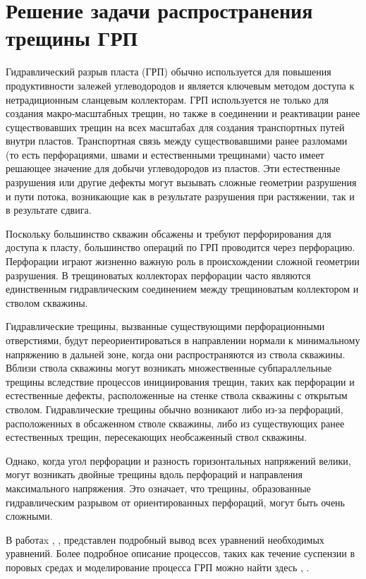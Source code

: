 \chapter*{Решение задачи распространения трещины ГРП}

Гидравлический разрыв пласта (ГРП) обычно используется для повышения продуктивности залежей углеводородов и является ключевым методом доступа к нетрадиционным сланцевым коллекторам. ГРП используется не только для создания макро-масштабных трещин, но также в соединении и реактивации ранее существовавших трещин на всех масштабах для создания транспортных путей внутри пластов. Транспортная связь между существовавшими ранее разломами (то есть перфорациями, швами и естественными трещинами) часто имеет решающее значение для добычи углеводородов из пластов. Эти естественные разрушения или другие дефекты могут вызывать сложные геометрии разрушения и пути потока, возникающие как в результате разрушения при растяжении, так и в результате сдвига. 

Поскольку большинство скважин обсажены и требуют перфорирования для доступа к пласту, большинство операций по ГРП проводится через перфорацию. Перфорации играют жизненно важную роль в происхождении сложной геометрии разрушения. В трещиноватых коллекторах перфорации часто являются единственным гидравлическим соединением между трещиноватым коллектором и стволом скважины. 

Гидравлические трещины, вызванные существующими перфорационными отверстиями, будут переориентироваться в направлении нормали к минимальному напряжению в дальней зоне, когда они распространяются из ствола скважины. Вблизи ствола скважины могут возникать множественные субпараллельные трещины вследствие процессов инициирования трещин, таких как перфорации и естественные дефекты, расположенные на стенке ствола скважины с открытым стволом. Гидравлические трещины обычно возникают либо из-за перфораций, расположенных в обсаженном стволе скважины, либо из существующих ранее естественных трещин, пересекающих необсаженный ствол скважины. 

\newpage

Однако, когда угол перфорации и разность горизонтальных напряжений велики, могут возникать двойные трещины вдоль перфораций и направления максимального напряжения. Это означает, что трещины, образованные гидравлическим разрывом от ориентированных перфораций, могут быть очень сложными.

В работаx \cite{selvadurai1996mechanics}, \cite{wang2017theory}, \cite{merxhani2016introduction} представлен подробный вывод всех уравнений необходимых уравнений. Более подробное описание процессов, таких как течение суспензии в поровых средах и моделирование процесса ГРП можно найти здесь \cite{liu2019fluid}, \cite{veatch2017essentials}.

